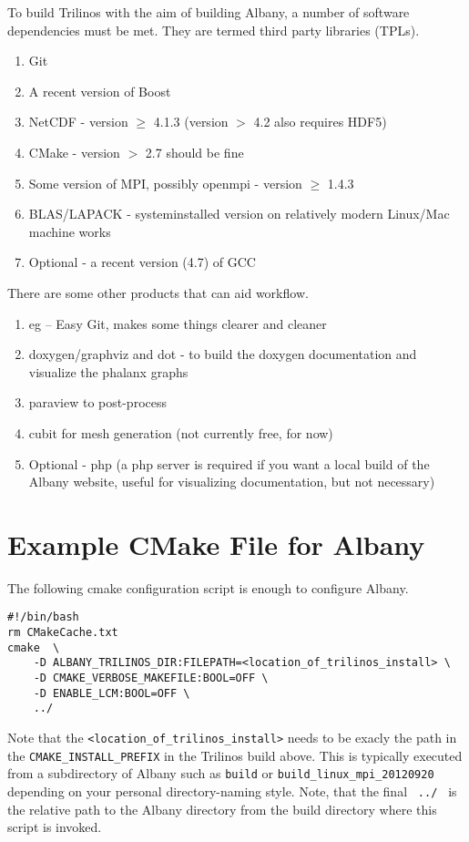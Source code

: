 \documentclass[pdf,12pt,report,strict]{SANDreport}
\theoremstyle{remark}
\begin{document}
To build Trilinos with the aim of building Albany, a number of
software dependencies must be met. They are termed third party
libraries (TPLs). 
\begin{enumerate}
\item Git
\item A recent version of Boost
\item NetCDF - version $\ge$ 4.1.3 (version $>$ 4.2 also requires
  HDF5)
\item CMake - version $>$ 2.7 should be fine
\item Some version of MPI, possibly openmpi - version $\ge$ 1.4.3
\item BLAS/LAPACK - systeminstalled version on relatively modern
  Linux/Mac machine works
\item Optional - a recent version (4.7) of GCC
\end{enumerate}
There are some other products that can aid workflow.
\begin{enumerate}
\item eg -- Easy Git, makes some things clearer and cleaner
\item doxygen/graphviz and dot - to build the doxygen documentation
  and visualize the phalanx graphs
\item paraview to post-process
\item cubit for mesh generation (not currently free, for now)
\item Optional - php (a php server is required if you want a local
  build of the Albany website, useful for visualizing documentation,
  but not necessary)
\end{enumerate}

\section{Example CMake File for Albany}
The following cmake configuration script is enough to configure Albany.
\begin{verbatim}
#!/bin/bash
rm CMakeCache.txt
cmake  \
    -D ALBANY_TRILINOS_DIR:FILEPATH=<location_of_trilinos_install> \
    -D CMAKE_VERBOSE_MAKEFILE:BOOL=OFF \
    -D ENABLE_LCM:BOOL=OFF \
    ../
\end{verbatim}
Note that the \texttt{<location\_of\_trilinos\_install>} needs to be
exacly the path in the \texttt{CMAKE\_INSTALL\_PREFIX} in the Trilinos
build above.  This is typically executed from a subdirectory of Albany such as
\texttt{build} or \texttt{build\_linux\_mpi\_20120920} depending on
your personal directory-naming style.
Note, that the final \texttt{   ../  } is the relative path to the Albany
directory from the build directory where this script is invoked.
\end{document}
